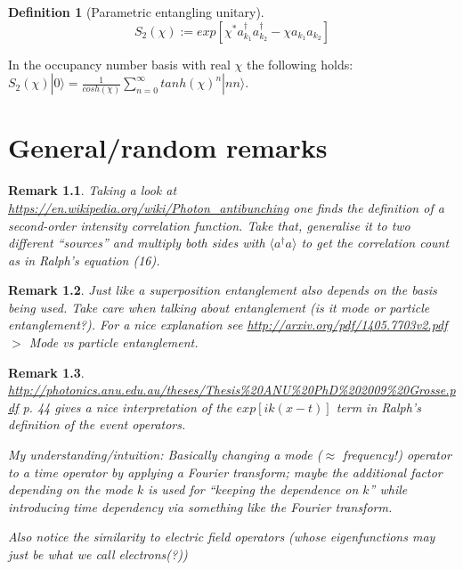 \documentclass[11pt]{report}
\newtheorem{definition}{Definition}[chapter]
\newtheorem*{remark}{Remark}
\begin{document}
\begin{definition}[Parametric entangling unitary]
	$$S_2(\chi) := exp[\chi^*a_{k_1}^\dagger a_{k_2}^\dagger - \chi a_{k_1}a_{k_2}]$$
\end{definition}

In the occupancy number basis with real $\chi$ the following holds: $S_2(\chi)|0\rangle = \frac{1}{cosh(\chi)}\sum_{n=0}^\infty tanh(\chi)^n |nn\rangle$.

\chapter{General/random remarks}

\begin{remark}
	Taking a look at \url{https://en.wikipedia.org/wiki/Photon_antibunching} one finds the definition of a second-order intensity correlation function. Take that, generalise it to two different ``sources'' and multiply both sides with $\langle a^\dagger a\rangle$ to get the correlation count as in Ralph's equation (16).
\end{remark}

\begin{remark}
	Just like a superposition entanglement also depends on the basis being used. Take care when talking about entanglement (is it mode or particle entanglement?). For a nice explanation see \url{http://arxiv.org/pdf/1405.7703v2.pdf} $>$ Mode vs particle entanglement. 
\end{remark}

\begin{remark}
	\url{http://photonics.anu.edu.au/theses/Thesis\%20ANU\%20PhD\%202009\%20Grosse.pdf} p. 44 gives a nice interpretation of the $exp[ik(x-t)]$ term in Ralph's definition of the event operators.
	
	My understanding/intuition: Basically changing a mode ($\approx$ frequency!) operator to a time operator by applying a Fourier transform; maybe the additional factor depending on the mode $k$ is used for ``keeping the dependence on $k$'' while introducing time dependency via something like the Fourier transform.
	
	Also notice the similarity to electric field operators (whose eigenfunctions may just be what we call electrons(?))
\end{remark}
\end{document}
